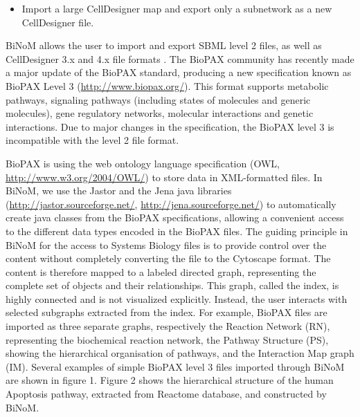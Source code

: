 \documentclass[10pt]{bmc_article}
\newenvironment{bmcformat}{\baselineskip20pt\sloppy\setboolean{publ}{false}}{\baselineskip20pt\sloppy}
\begin{document}
\begin{bmcformat}
\begin{itemize}
\item Import a large CellDesigner map and export only a subnetwork as a new CellDesigner file.

\end{itemize}

BiNoM allows the user to import and export SBML level 2 files, as well as
CellDesigner 3.x and 4.x file formats \cite{zinovyev2008binom}. The BioPAX
community has recently made a major update of the BioPAX standard, producing a
new specification known as BioPAX Level 3 (\url{http://www.biopax.org/}). This
format supports metabolic pathways, signaling pathways (including states of molecules
and generic molecules), gene regulatory networks, molecular interactions and
genetic interactions. Due to major changes in the
specification, the BioPAX level 3 is incompatible with the level 2 file format.

BioPAX is using the web ontology language specification (OWL,
\url{http://www.w3.org/2004/OWL/}) to store data in XML-formatted files. In
BiNoM, we use the Jastor and the Jena java libraries
(\url{http://jastor.sourceforge.net/}, \url{http://jena.sourceforge.net/}) to
automatically create java classes from the BioPAX specifications, allowing a
convenient access to the different data types encoded in the BioPAX files. The
guiding principle in BiNoM for the
access to Systems Biology files is to provide control over the content without
completely converting the file to the Cytoscape format. The content is therefore
mapped to a labeled directed graph, representing the complete set of objects and
their relationships. This graph, called the index, is highly connected and is
not visualized explicitly. Instead, the user interacts with selected subgraphs
extracted from the index. For example, BioPAX files are imported as three
separate graphs, respectively the Reaction Network (RN), representing the
biochemical reaction network, the Pathway Structure (PS), showing the
hierarchical organisation of pathways, and the Interaction Map graph
(IM). Several examples of simple BioPAX level 3 files imported through BiNoM
are shown in figure 1. Figure 2
shows the hierarchical structure of the human Apoptosis pathway, extracted
from Reactome database, and constructed by BiNoM.


\end{bmcformat}
\end{document}

